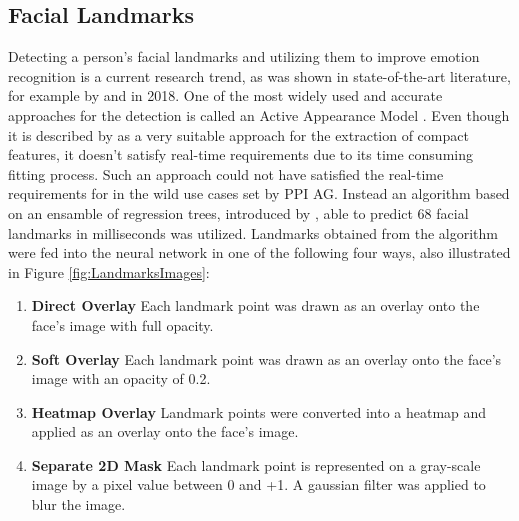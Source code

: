 \subsection{Facial Landmarks}
Detecting a person's facial landmarks and utilizing them to improve emotion recognition is a current research trend, as was shown in state-of-the-art literature, for example by \citet{Gupta:2018:FacialLandmarks-1} and \citet{Tautkute:2018:FacialLandmarks-2} in 2018. One of the most widely used and accurate approaches for the detection is called an Active Appearance Model \citep{Cootes:2001:ActiveAppearanceModel}. Even though it is described by \citet{Gao:2010:ActiveAppearanceModels} as a very suitable approach for the extraction of compact features, it doesn't satisfy real-time requirements due to its time consuming fitting process.
\newline\newline
Such an approach could not have satisfied the real-time requirements for in the wild use cases set by PPI AG. Instead an algorithm based on an ensamble of regression trees, introduced by \citet{Kazemi:2014:ShapePredictor}, able to predict 68 facial landmarks in milliseconds was utilized.
\newline\newline
Landmarks obtained from the algorithm were fed into the neural network in one of the following four ways, also illustrated in Figure \ref{fig:LandmarksImages}: 

\begin{enumerate}
    \item \textbf{Direct Overlay} \newline \indent Each landmark point was drawn as an overlay onto the face's image with full opacity.
    \item \textbf{Soft Overlay} \newline \indent Each landmark point was drawn as an overlay onto the face's image with an opacity of 0.2.
    \item \textbf{Heatmap Overlay} \newline \indent Landmark points were converted into a heatmap and applied as an overlay onto the face's image.
    \item \textbf{Separate 2D Mask} \newline \indent Each landmark point is represented on a gray-scale image by a pixel value between 0 and +1. A gaussian filter was applied to blur the image.
\end{enumerate}

